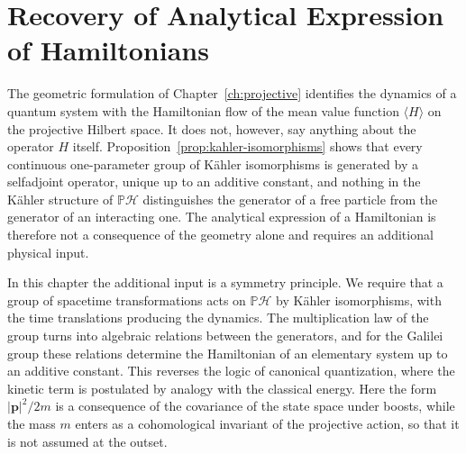 
\setlength{\headwidth}{\textwidth}


\setcounter{chapter}{4}


\chapter{Recovery of Analytical Expression of Hamiltonians}
\label{ch:analytical-hamiltonians}

The geometric formulation of Chapter~\ref{ch:projective} identifies the dynamics of a quantum system with the Hamiltonian flow of the mean value function $\langle H\rangle$ on the projective Hilbert space. It does not, however, say anything about the operator $H$ itself. Proposition~\ref{prop:kahler-isomorphisms} shows that every continuous one-parameter group of Kähler isomorphisms is generated by a selfadjoint operator, unique up to an additive constant, and nothing in the Kähler structure of $\mathbb{P}\mathcal{H}$ distinguishes the generator of a free particle from the generator of an interacting one. The analytical expression of a Hamiltonian is therefore not a consequence of the geometry alone and requires an additional physical input.

In this chapter the additional input is a symmetry principle. We require that a group of spacetime transformations acts on $\mathbb{P}\mathcal{H}$ by Kähler isomorphisms, with the time translations producing the dynamics. The multiplication law of the group turns into algebraic relations between the generators, and for the Galilei group these relations determine the Hamiltonian of an elementary system up to an additive constant. This reverses the logic of canonical quantization, where the kinetic term is postulated by analogy with the classical energy. Here the form $|\mathbf{p}|^2/2m$ is a consequence of the covariance of the state space under boosts, while the mass $m$ enters as a cohomological invariant of the projective action, so that it is not assumed at the outset.

